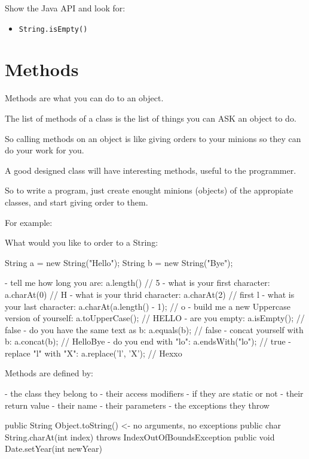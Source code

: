 \documentclass[a4paper, 9pt]{extarticle}
\begin{document}
Show the Java API and look for:

\begin{itemize}
  \item \verb+String.isEmpty()+
\end{itemize}





\section{Methods}

Methods are what you can do to an object.

The list of methods of a class is the list of things you can ASK an object to
do.

So calling methods on an object is like giving orders to your minions so they
can do your work for you.

A good designed class will have interesting methods, useful to the programmer.

So to write a program, just create enought minions (objects) of the appropiate
classes, and start giving order to them.

For example:

\begin{blackboard}
What would you like to order to a String:

String a = new String("Hello");
String b = new String("Bye");

- tell me how long you are: a.length() // 5
- what is your first character: a.charAt(0) // H
- what is your thrid character: a.charAt(2) // first l
- what is your last character: a.charAt(a.length() - 1); // o
- build me a new Uppercase version of yourself: a.toUpperCase(); // HELLO
- are you empty: a.isEmpty(); // false
- do you have the same text as b: a.equals(b); // false
- concat yourself with b: a.concat(b); // HelloBye
- do you end with "lo": a.endsWith("lo"); // true
- replace "l" with "X": a.replace('l', 'X'); // Hexxo
\end{blackboard}

Methods are defined by:

\begin{blackboard}
- the class they belong to
- their access modifiers
- if they are static or not
- their return value
- their name
- their parameters
- the exceptions they throw

public String Object.toString()  <- no arguments, no exceptions
public char   String.charAt(int index) throws IndexOutOfBoundsException
public void   Date.setYear(int newYear)
\end{blackboard}
\end{document}
